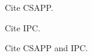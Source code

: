 \documentclass{article}
\begin{document}
Cite CSAPP.
\cite{CSAPP}

Cite IPC.
\cite{IPC}

Cite CSAPP and IPC.
\cite{CSAPP,IPC}


\end{document}
